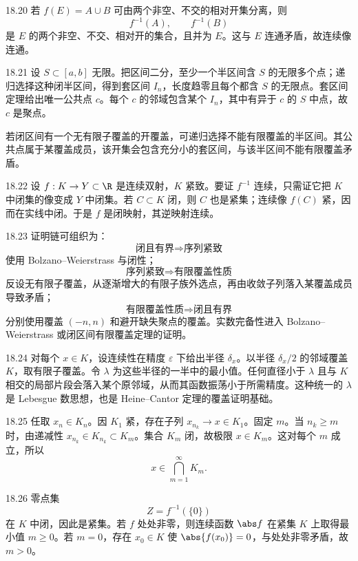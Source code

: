 \begin{solution}{18.20}
若 \(f(E)=A\cup B\) 可由两个非空、不交的相对开集分离，则
\[
 f^{-1}(A),\qquad f^{-1}(B)
\]
是 \(E\) 的两个非空、不交、相对开的集合，且并为 \(E\)。这与 \(E\) 连通矛盾，故连续像连通。
\end{solution}

\begin{solution}{18.21}
设 \(S\subset[a,b]\) 无限。把区间二分，至少一个半区间含 \(S\) 的无限多个点；递归选择这种闭半区间，得到套区间 \(I_n\)，长度趋零且每个都含 \(S\) 的无限点。套区间定理给出唯一公共点 \(c\)。每个 \(c\) 的邻域包含某个 \(I_n\)，其中有异于 \(c\) 的 \(S\) 中点，故 \(c\) 是聚点。

若闭区间有一个无有限子覆盖的开覆盖，可递归选择不能有限覆盖的半区间。其公共点属于某覆盖成员，该开集会包含充分小的套区间，与该半区间不能有限覆盖矛盾。
\end{solution}

\begin{solution}{18.22}
设 \(f:K\to Y\subset\R\) 是连续双射，\(K\) 紧致。要证 \(f^{-1}\) 连续，只需证它把 \(K\) 中闭集的像变成 \(Y\) 中闭集。若 \(C\subset K\) 闭，则 \(C\) 也是紧集；连续像 \(f(C)\) 紧，因而在实线中闭。于是 \(f\) 是闭映射，其逆映射连续。
\end{solution}

\begin{solution}{18.23}
证明链可组织为：
\[
 \text{闭且有界}\Rightarrow\text{序列紧致}
\]
使用 Bolzano--Weierstrass 与闭性；
\[
 \text{序列紧致}\Rightarrow\text{有限覆盖性质}
\]
反设无有限子覆盖，从逐渐增大的有限子族外选点，再由收敛子列落入某覆盖成员导致矛盾；
\[
 \text{有限覆盖性质}\Rightarrow\text{闭且有界}
\]
分别使用覆盖 \((-n,n)\) 和避开缺失聚点的覆盖。实数完备性进入 Bolzano--Weierstrass 或闭区间有限覆盖定理的证明。
\end{solution}

\begin{solution}{18.24}
对每个 \(x\in K\)，设连续性在精度 \(\varepsilon\) 下给出半径 \(\delta_x\)。以半径 \(\delta_x/2\) 的邻域覆盖 \(K\)，取有限子覆盖。令 \(\lambda\) 为这些半径的一半中的最小值。任何直径小于 \(\lambda\) 且与 \(K\) 相交的局部片段会落入某个原邻域，从而其函数振荡小于所需精度。这种统一的 \(\lambda\) 是 Lebesgue 数思想，也是 Heine--Cantor 定理的覆盖证明基础。
\end{solution}

\begin{solution}{18.25}
任取 \(x_n\in K_n\)。因 \(K_1\) 紧，存在子列 \(x_{n_k}\to x\in K_1\)。固定 \(m\)。当 \(n_k\ge m\) 时，由递减性 \(x_{n_k}\in K_{n_k}\subset K_m\)。集合 \(K_m\) 闭，故极限 \(x\in K_m\)。这对每个 \(m\) 成立，所以
\[
 x\in\bigcap_{m=1}^{\infty}K_m.
\]
\end{solution}

\begin{solution}{18.26}
零点集
\[
 Z=f^{-1}(\{0\})
\]
在 \(K\) 中闭，因此是紧集。若 \(f\) 处处非零，则连续函数 \(\abs f\) 在紧集 \(K\) 上取得最小值 \(m\ge0\)。若 \(m=0\)，存在 \(x_0\in K\) 使 \(\abs{f(x_0)}=0\)，与处处非零矛盾，故 \(m>0\)。
\end{solution}
